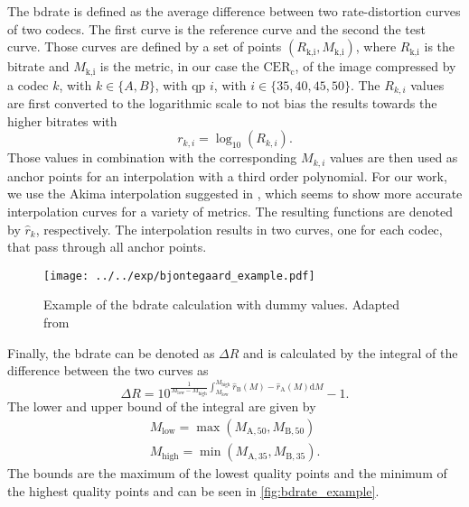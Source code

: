 The \gls{bdrate} \cite{bdrate_original_2001}\cite{bdrate_beyond_2022} is defined as the average difference between two rate-distortion curves of two codecs.
The first curve is the reference curve and the second the test curve.
Those curves are defined by a set of points $(R_{\text{k,i}}, M_{\text{k,i}})$, where $R_{\text{k,i}}$ is the bitrate and $M_{\text{k,i}}$ is the metric, in our case the $\text{CER}_{\text{c}}$, of the image compressed by a codec $k$, with $k \in \{A,B\}$, with \gls{qp} $i$, with $i \in \{35,40,45,50\}$.
The $R_{k,i}$ values are first converted to the logarithmic scale to not bias the results towards the higher bitrates with
\begin{equation}
    r_{k,i} = \log_{10}\left(R_{k,i}\right).
    \label{eq:log_scale}
\end{equation}
Those values in combination with the corresponding $M_{k,i}$ values are then used as anchor points for an interpolation with a third order polynomial.
For our work, we use the Akima interpolation suggested in \cite{bdrate_beyond_2022}, which seems to show more accurate interpolation curves for a variety of metrics.
The resulting functions are denoted by $\hat{r}_{k}$, respectively.
The interpolation results in two curves, one for each codec, that pass through all anchor points.
\begin{figure}
    \centering
    \texttt{[image: ../../exp/bjontegaard\_example.pdf]}
    \caption{Example of the \gls{bdrate} calculation with dummy values. Adapted from \cite{bdrate_beyond_2022}}
    \label{fig:bdrate_example}
\end{figure}
Finally, the \gls{bdrate} can be denoted as $\Delta R$ and is calculated by the integral of the difference between the two curves as
\begin{equation}
    \Delta R = 10^{\frac{1}{M_{\text{low}}-M_{\text{high}}} \int_{M_{\text{low}}}^{M_{\text{high}}} \hat{r}_{\text{B}}(M) - \hat{r}_{\text{A}}(M) \text{d}M} - 1.
    \label{eq:bdrate}
\end{equation}
The lower and upper bound of the integral are given by
\begin{equation}
    \begin{aligned}
        M_{\text{low}} = \max\left(M_{\text{A},50}, M_{\text{B},50}\right) \\
        M_{\text{high}} = \min\left(M_{\text{A},35}, M_{\text{B},35}\right).
    \end{aligned}
    \label{eq:bounds}
\end{equation}
The bounds are the maximum of the lowest quality points and the minimum of the highest quality points and can be seen in \autoref{fig:bdrate_example}.


